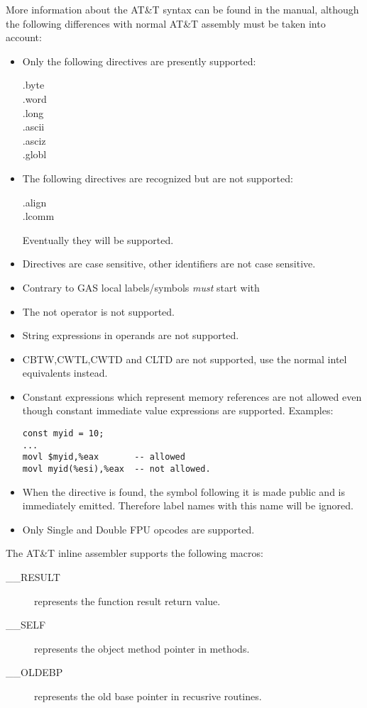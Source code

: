 More information about the AT\&T syntax can be found in the  manual,
although the following differences with normal AT\&T assembly must be taken
into account:
\begin{itemize}
\item  Only the following directives are presently supported:
 \begin{description}
\item[.byte]
\item[.word]
\item[.long]
\item[.ascii]
\item[.asciz]
\item[.globl]
\end{description}
\item  The following directives are recognized but are not
   supported:
\begin{description}
\item[.align]
\item[.lcomm]
\end{description}
Eventually they will be supported.
\item Directives are case sensitive, other identifiers are not case sensitive.
\item  Contrary to GAS local labels/symbols {\em must} start with 
\item  The not operator  is not supported.
\item  String expressions in operands are not supported.
\item  CBTW,CWTL,CWTD and CLTD are not supported, use the normal intel
equivalents instead.
\item  Constant expressions which represent memory references are not
allowed even though constant immediate value expressions are supported.
Examples:
\begin{verbatim}
const myid = 10;
...
movl $myid,%eax       -- allowed
movl myid(%esi),%eax  -- not allowed.
\end{verbatim}
\item When the  directive is found, the symbol following
    it is made public and is immediately emitted.
    Therefore label names with this name will be ignored.
\item  Only Single and Double FPU opcodes are supported.
\end{itemize}

The AT\&T inline assembler supports the following macros:
\begin{description}
\item [\_\_RESULT] represents the function result return value.
\item [\_\_SELF]   represents the object method pointer in methods.
\item [\_\_OLDEBP] represents the old base pointer in recusrive routines.
\end{description}


